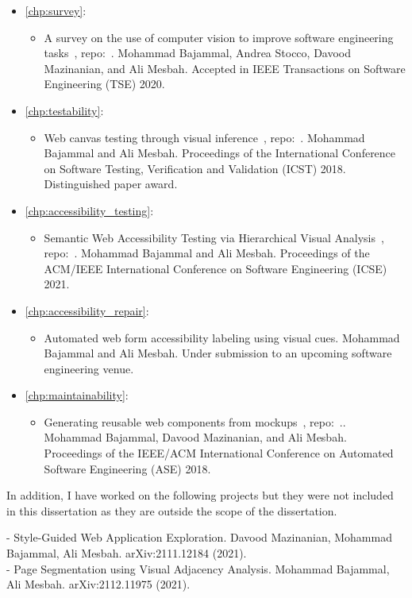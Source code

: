 \begin{itemize}
	\item \autoref{chp:survey}: 
		\begin{itemize}
		\item A survey on the use of computer vision to improve software engineering tasks~\cite{bajammal2020survey}, repo:~\cite{tse-repo}. Mohammad Bajammal, Andrea Stocco, Davood Mazinanian, and Ali Mesbah. Accepted in IEEE Transactions on Software Engineering (TSE) 2020.
	\end{itemize}
	
	
	\item \autoref{chp:testability}: 
		\begin{itemize}
		\item Web canvas testing through visual inference~\cite{canvas_icst2018}, repo:~\cite{icst-repo}. 
		Mohammad Bajammal and Ali Mesbah. 
		Proceedings of the International Conference on Software Testing, Verification and Validation (ICST) 2018. Distinguished paper award.
	\end{itemize}
	
	
	\item \autoref{chp:accessibility_testing}: 
		\begin{itemize}
		\item Semantic Web Accessibility Testing via Hierarchical Visual Analysis~\cite{bajammal2021semantic}, repo:~\cite{icse-repo}. 
		Mohammad Bajammal and Ali Mesbah. 
		Proceedings of the ACM/IEEE International Conference on Software Engineering (ICSE) 2021. 
	\end{itemize}
	

	\item \autoref{chp:accessibility_repair}: 
		\begin{itemize}
		\item Automated web form accessibility labeling using visual cues. Mohammad Bajammal and Ali Mesbah. Under submission to an upcoming software engineering venue.  
	\end{itemize}
	

	\item \autoref{chp:maintainability}: 
	\begin{itemize}
		\item Generating reusable web components from mockups~\cite{bajammal2018generating}, repo:~\cite{ase-repo}.. 
		Mohammad Bajammal, Davood Mazinanian, and Ali Mesbah. 
		Proceedings of the IEEE/ACM International Conference on Automated Software Engineering (ASE) 2018. 
	\end{itemize}

\end{itemize} 

In addition, I have worked on the following projects but they were not included in this dissertation as they are outside 
the scope of the dissertation. 

\noindent
- Style-Guided Web Application Exploration. Davood Mazinanian, Mohammad Bajammal, Ali Mesbah. arXiv:2111.12184 (2021). \\ 
- Page Segmentation using Visual Adjacency Analysis. Mohammad Bajammal, Ali Mesbah.  arXiv:2112.11975 (2021).  
